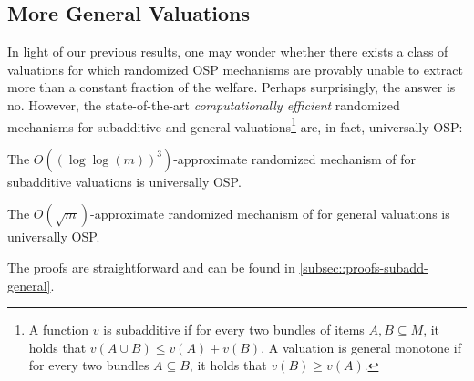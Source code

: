 \subsection{More General Valuations}
In light of our previous results, one may wonder whether there exists a  class of valuations for which randomized OSP mechanisms are provably unable to extract more than a constant fraction of the welfare. Perhaps surprisingly, the answer is no. However, the state-of-the-art \emph{computationally efficient} randomized mechanisms for subadditive and general valuations\footnote{A function $v$ is subadditive if for every two bundles of items $A, B \subseteq M$, it holds that $v(A \cup B) \leq v(A) + v(B)$. A valuation is general monotone if for every two bundles $A\subseteq B$, it holds that $v(B)\ge v(A)$.} are, in fact, universally OSP:
\begin{claim}\label{cl:subadditive}
    The $O((\log\log(m))^3)$-approximate randomized mechanism of \cite{assadi2021improved} for subadditive valuations is universally OSP.
\end{claim}
\begin{claim}\label{cl:general}
The $O(\sqrt{m})$-approximate randomized mechanism of \cite{dobzinski2012truthful} for general valuations is universally OSP.
\end{claim}
The proofs are straightforward and can be found in \cref{subsec::proofs-subadd-general}. 
